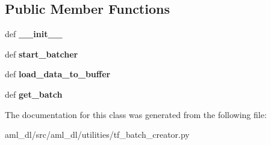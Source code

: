 \subsection*{Public Member Functions}
\begin{DoxyCompactItemize}
\item 
\hypertarget{classsrc_1_1aml__dl_1_1utilities_1_1tf__batch__creator_1_1_batch_creator_ab50c3143c3affca454228d60a2f5bb96}{def {\bfseries \-\_\-\-\_\-init\-\_\-\-\_\-}}\label{classsrc_1_1aml__dl_1_1utilities_1_1tf__batch__creator_1_1_batch_creator_ab50c3143c3affca454228d60a2f5bb96}

\item 
\hypertarget{classsrc_1_1aml__dl_1_1utilities_1_1tf__batch__creator_1_1_batch_creator_a19457cb3db9b6ac13b93755bbe7c12de}{def {\bfseries start\-\_\-batcher}}\label{classsrc_1_1aml__dl_1_1utilities_1_1tf__batch__creator_1_1_batch_creator_a19457cb3db9b6ac13b93755bbe7c12de}

\item 
\hypertarget{classsrc_1_1aml__dl_1_1utilities_1_1tf__batch__creator_1_1_batch_creator_a34ae5372026672a949991b4be886b8b1}{def {\bfseries load\-\_\-data\-\_\-to\-\_\-buffer}}\label{classsrc_1_1aml__dl_1_1utilities_1_1tf__batch__creator_1_1_batch_creator_a34ae5372026672a949991b4be886b8b1}

\item 
\hypertarget{classsrc_1_1aml__dl_1_1utilities_1_1tf__batch__creator_1_1_batch_creator_a49ef8b29356437b4b6be4948d1f51366}{def {\bfseries get\-\_\-batch}}\label{classsrc_1_1aml__dl_1_1utilities_1_1tf__batch__creator_1_1_batch_creator_a49ef8b29356437b4b6be4948d1f51366}

\end{DoxyCompactItemize}


The documentation for this class was generated from the following file\-:\begin{DoxyCompactItemize}
\item 
aml\-\_\-dl/src/aml\-\_\-dl/utilities/tf\-\_\-batch\-\_\-creator.\-py\end{DoxyCompactItemize}

